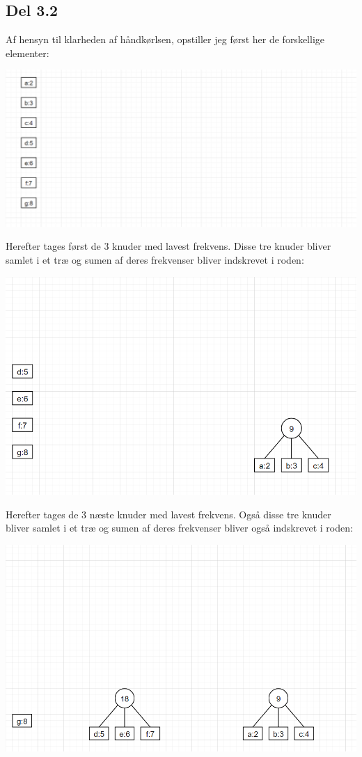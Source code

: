 \documentclass{report}
\begin{document}
\subsection*{Del 3.2}
Af hensyn til klarheden af håndkørlsen, opstiller jeg først her de forskellige elementer:
\begin{center}
    \includegraphics[height = 5 cm]{../entities/huffman1.PNG}
\end{center}
Herefter tages først de 3 knuder med lavest frekvens. Disse tre knuder bliver samlet i et træ og sumen af deres frekvenser bliver indskrevet i roden:
\begin{center}
    \includegraphics[height = 5 cm]{../entities/huffman2.PNG}
\end{center}
Herefter tages de 3 næste knuder med lavest frekvens. Også disse tre knuder bliver samlet i et træ og sumen af deres frekvenser bliver også indskrevet i roden:
\begin{center}
    \includegraphics[height = 5 cm]{../entities/huffman3.PNG}
\end{center}
\end{document}
